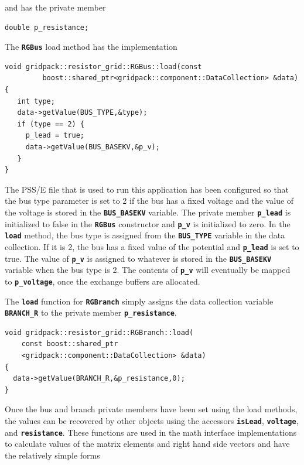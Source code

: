 \documentclass[12pt]{report} %
\begin{document}
and has the private member

{
\color{red}
\begin{Verbatim}[fontseries=b]
double p_resistance;
\end{Verbatim}
}

The \texttt{\textbf{RGBus}} load method has the implementation

{
\color{red}
\begin{Verbatim}[fontseries=b]
void gridpack::resistor_grid::RGBus::load(const
         boost::shared_ptr<gridpack::component::DataCollection> &data)
{
   int type;
   data->getValue(BUS_TYPE,&type);
   if (type == 2) {
     p_lead = true;
     data->getValue(BUS_BASEKV,&p_v);
   }
}
\end{Verbatim}
}

The PSS/E file that is used to run this application has been configured so that the bus type parameter is set to 2 if the bus has a fixed voltage and the value of the voltage is stored in the \texttt{\textbf{BUS\_BASEKV}} variable. The private member \texttt{\textbf{p\_lead}} is initialized to false in the \texttt{\textbf{RGBus}} constructor and \texttt{\textbf{p\_v}} is initialized to zero. In the \texttt{\textbf{load}} method, the bus type is assigned from the \texttt{\textbf{BUS\_TYPE}} variable in the data collection. If it is 2, the bus has a fixed value of the potential and \texttt{\textbf{p\_lead}} is set to true. The value of \texttt{\textbf{p\_v}} is assigned to whatever is stored in the \texttt{\textbf{BUS\_BASEKV}} variable when the bus type is 2. The contents of \texttt{\textbf{p\_v}} will eventually be mapped to \texttt{\textbf{p\_voltage}}, once the exchange buffers are allocated.

The \texttt{\textbf{load}} function for \texttt{\textbf{RGBranch}} simply assigns the data collection variable \texttt{\textbf{BRANCH\_R}} to the private member \texttt{\textbf{p\_resistance}}.

{
\color{red}
\begin{Verbatim}[fontseries=b]
void gridpack::resistor_grid::RGBranch::load(
    const boost::shared_ptr
    <gridpack::component::DataCollection> &data)
{
  data->getValue(BRANCH_R,&p_resistance,0);
}
\end{Verbatim}
}

Once the bus and branch private members have been set using the load methods, the values can be recovered by other objects using the accessors \texttt{\textbf{isLead}}, \texttt{\textbf{voltage}}, and \texttt{\textbf{resistance}}. These functions are used in the math interface implementations to calculate values of the matrix elements and right hand side vectors and have the relatively simple forms
\end{document}
